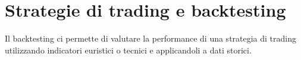 
\section{Strategie di trading e backtesting}

Il backtesting ci permette di valutare la performance di una strategia di trading utilizzando
indicatori euristici o tecnici e applicandoli a dati storici.